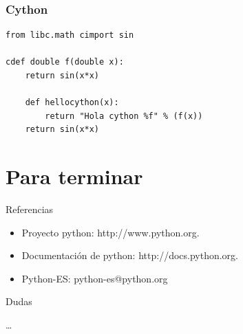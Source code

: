 \documentclass[10pt]{beamer}
\begin{document}
  \begin{frame}[containsverbatim]
    \frametitle{Cython}
    \begin{verbatim}
from libc.math cimport sin

cdef double f(double x):
    return sin(x*x)

    def hellocython(x):
        return "Hola cython %f" % (f(x))
    return sin(x*x)
    \end{verbatim}
  \end{frame}

  \section{Para terminar}
  
  \begin{frame}{Referencias}
    \begin{itemize}
      \item Proyecto python: http://www.python.org.
      \item Documentación de python: http://docs.python.org.
      \item Python-ES: python-es@python.org
    \end{itemize}
  \end{frame}

  \begin{frame}{Dudas}
    \begin{center}
      \dots
    \end{center}
  \end{frame}
\end{document}
